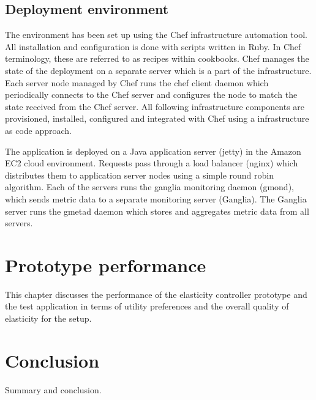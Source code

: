 \documentclass[english]{tktltiki2}
\theoremstyle{definition}
\theoremstyle{remark}
\begin{document}
\subsection{Deployment environment}

The environment has been set up using the Chef infrastructure automation tool. All installation and configuration is done with scripts written in Ruby. In Chef terminology, these are referred to as recipes within cookbooks. Chef manages the state of the deployment on a separate server which is a part of the infrastructure. Each server node managed by Chef runs the chef client daemon which periodically connects to the Chef server and configures the node to match the state received from the Chef server. All following infrastructure components are provisioned, installed, configured and integrated with Chef using a infrastructure as code approach.

The application is deployed on a Java application server (jetty) in the Amazon EC2 cloud environment. Requests pass through a load balancer (nginx) which distributes them to application server nodes using a simple round robin algorithm. Each of the servers runs the ganglia monitoring daemon (gmond), which sends metric data to a separate monitoring server (Ganglia). The Ganglia server runs the gmetad daemon which stores and aggregates metric data from all servers.







\section{Prototype performance}
\label{relatedwork}

This chapter discusses the performance of the elasticity controller prototype and the test application in terms of utility preferences and the overall quality of elasticity for the setup. 

\section{Conclusion}
\label{conclusion}

Summary and conclusion.


%
%
% 
%




\end{document}
